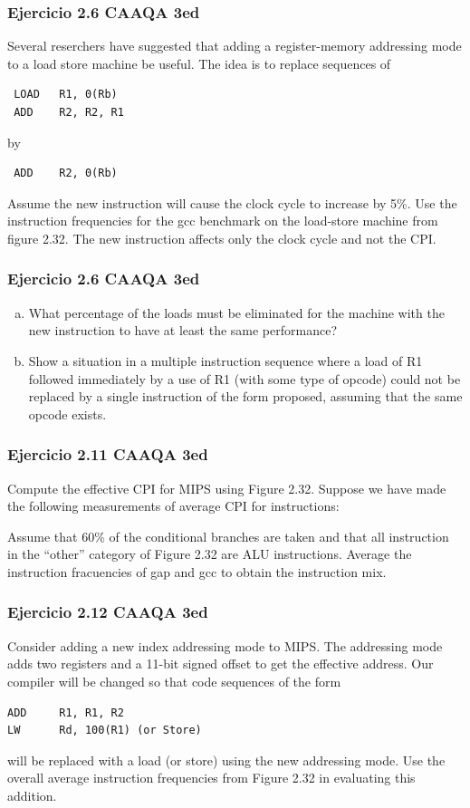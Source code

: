 \documentclass{beamer}
\begin{document}
\begin{frame}[fragile]
 \frametitle{Ejercicio 2.6 CAAQA 3ed}
 Several reserchers have suggested that adding a register-memory addressing mode to a load store machine be useful. The idea is to replace sequences of
 
\begin{lstlisting}
 LOAD   R1, 0(Rb)
 ADD    R2, R2, R1
\end{lstlisting}

by

\begin{lstlisting}
 ADD    R2, 0(Rb)
\end{lstlisting}

Assume the new instruction will cause the clock cycle to increase by 5\%. Use the instruction frequencies for the gcc benchmark on the load-store machine from figure 2.32. The new instruction affects only the clock cycle and not the CPI.
\end{frame}
\begin{frame}
 \frametitle{Ejercicio 2.6 CAAQA 3ed}
\begin{enumerate}[a.]
 \item What percentage of the loads must be eliminated for the machine with the new instruction to have at least the same performance?
 
 \item Show a situation in a multiple instruction sequence where a load of R1 followed immediately by a use of R1 (with some type of opcode) could not be replaced by a single instruction of the form proposed, assuming that the same opcode exists.
\end{enumerate}
\end{frame}

\begin{frame}
 \frametitle{Ejercicio 2.11 CAAQA 3ed}
 Compute the effective CPI for MIPS using Figure 2.32. Suppose we have made the following measurements of average CPI for instructions:
 
 Assume that 60\% of the conditional branches are taken and that all instruction in the ``other'' category of Figure 2.32 are ALU instructions. Average the instruction fracuencies of gap and gcc to obtain the instruction mix.
\end{frame}

\begin{frame}[fragile]
 \frametitle{Ejercicio 2.12 CAAQA 3ed}
Consider adding a new index addressing mode to MIPS. The addressing mode adds two registers and a 11-bit signed offset to get the effective address.
Our compiler will be changed so that code sequences of the form 

\begin{lstlisting}
ADD     R1, R1, R2
LW      Rd, 100(R1)	(or Store)
 \end{lstlisting}


will be replaced with a load (or store) using the new addressing mode. Use the overall average instruction frequencies from Figure 2.32 in evaluating this addition.

\end{frame}
\end{document}
